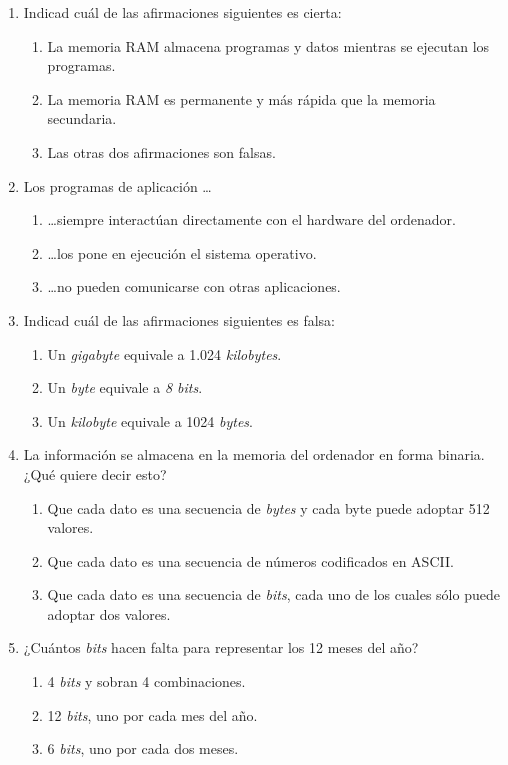 \begin{enumerate}
\item Indicad cuál de las afirmaciones siguientes es cierta: \begin{enumerate} \item La memoria RAM almacena programas y datos mientras se ejecutan los programas. \item La memoria RAM es permanente y más rápida que la memoria secundaria. \item Las otras dos afirmaciones son falsas. \end{enumerate} 

\item Los programas de aplicación \ldots \begin{enumerate} \item \ldots siempre interactúan directamente con el hardware del ordenador. \item \ldots los pone en ejecución el sistema operativo. \item \ldots no pueden comunicarse con otras aplicaciones. \end{enumerate} 

\item Indicad cuál de las afirmaciones siguientes es falsa: \begin{enumerate} \item Un \emph{gigabyte} equivale a 1.024 \emph{kilobytes}. \item Un \emph{byte} equivale a \emph{8 bits}. \item Un \emph{kilobyte} equivale a 1024 \emph{bytes}. \end{enumerate} 

\item La información se almacena en la memoria del ordenador en forma binaria. ¿Qué quiere decir esto? \begin{enumerate} \item Que cada dato es una secuencia de \emph{bytes} y cada byte puede adoptar 512 valores. \item Que cada dato es una secuencia de números codificados en ASCII. \item Que cada dato es una secuencia de \emph{bits}, cada uno de los cuales sólo puede adoptar dos valores. \end{enumerate} 

\item ¿Cuántos \emph{bits} hacen falta para representar los 12 meses del año? \begin{enumerate} \item 4 \emph{bits} y sobran 4 combinaciones. \item 12 \emph{bits}, uno por cada mes del año. \item 6 \emph{bits}, uno por cada dos meses. \end{enumerate} 


\end{enumerate}
